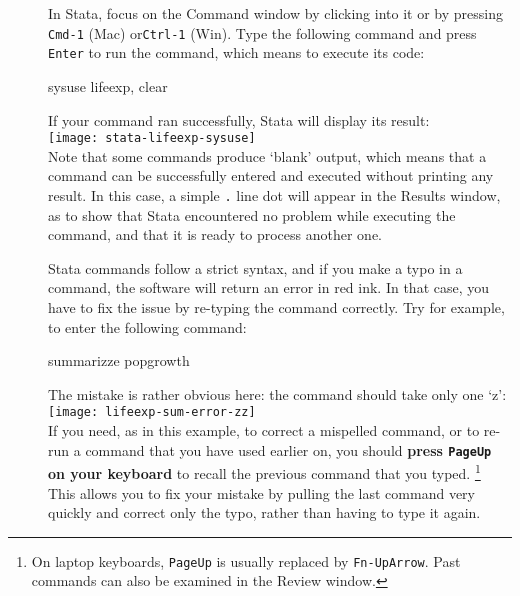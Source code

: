 		\begin{description}
			\item[]%
			\vspace{1em}%
			In Stata, focus on the Command window by clicking into it or by pressing \texttt{Cmd-1} (Mac) or\texttt{Ctrl-1} (Win). Type the following command and press \texttt{Enter} to run the command, which means to execute its code:%
			
		\begin{docspec}%
			\label{lifeexp}%
			sysuse lifeexp, clear
		\end{docspec}
			
		If your command ran successfully, Stata will display its result:\\[1em]
			
			\texttt{[image: stata-lifeexp-sysuse]}\\[1em]

		Note that some commands produce `blank' output, which means that a command can be successfully entered and executed without printing any result. In this case, a simple \texttt{.} line dot will appear in the Results window, as to show that Stata encountered no problem while executing the command, and that it is ready to process another one.%

			\item[] %
		Stata commands follow a strict syntax, and if you make a typo in a command, the software will return an error in red ink. In that case, you have to fix the issue by re-typing the command correctly. Try for example, to enter the following command:%
			
			\begin{docspec}
				summarizze popgrowth
			\end{docspec}
			
			The mistake is rather obvious here: the  command should take only one `z':\\[1em]%
			
			\texttt{[image: lifeexp-sum-error-zz]}\\[1em]
			
			If you need, as in this example, to correct a mispelled command, or to re-run a command that you have used earlier on, you should \textbf{press \texttt{PageUp} on your keyboard} to recall the previous command that you typed.%
			\footnote{On laptop keyboards, \texttt{PageUp} is usually replaced by \texttt{Fn-UpArrow}. Past commands can also be examined in the Review window.} %
			This allows you to fix your mistake by pulling the last command very quickly and correct only the typo, rather than having to type it again.%


\end{description}
